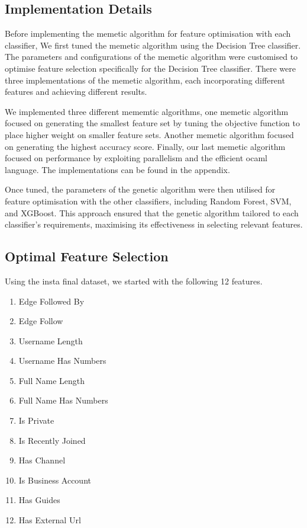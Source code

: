 \documentclass[conference]{IEEEtran}
\begin{document}
\subsection{Implementation Details}

Before implementing the memetic algorithm for feature optimisation with each classifier, We first tuned the memetic algorithm using the Decision Tree classifier. The parameters and configurations of the memetic algorithm were customised to optimise feature selection specifically for the Decision Tree classifier. There were three implementations of the memetic algorithm, each incorporating different features and achieving different results.

We implemented three different mememtic algorithms, one memetic algorithm focused on generating the smallest feature set by tuning the objective function to place higher weight on smaller feature sets. Another memetic algorithm focused on generating the highest accuracy score. Finally, our last memetic algorithm focused on performance by exploiting parallelism and the efficient ocaml language. The implementations can be found in the appendix.

Once tuned, the parameters of the genetic algorithm were then utilised for feature optimisation with the other classifiers, including Random Forest, SVM, and XGBoost. This approach ensured that the genetic algorithm tailored to each classifier's requirements, maximising its effectiveness in selecting relevant features.

\subsection{Optimal Feature Selection}

Using the insta final dataset, we started with the following 12 features.

\begin{enumerate}
\item Edge Followed By
\item Edge Follow
\item Username Length
\item Username Has Numbers
\item Full Name Length
\item Full Name Has Numbers
\item Is Private
\item Is Recently Joined
\item Has Channel
\item Is Business Account
\item Has Guides
\item Has External Url
\end{enumerate}
\end{document}
